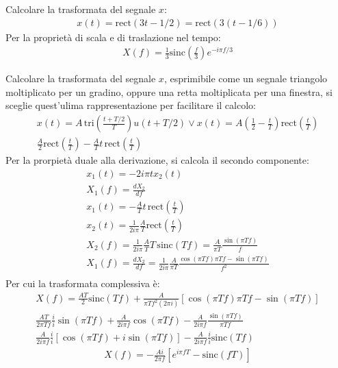 \documentclass{article}
\begin{document}
Calcolare la trasformata del segnale $x$: 
\begin{gather*}
    x(t)=\mbox{rect}(3t-1/2)=\mbox{rect}(3(t-1/6))
\end{gather*}
Per la proprietà di scala e di traslazione nel tempo:
\begin{gather}
    X(f)=\displaystyle\frac{1}{3}\mbox{sinc}\left(\frac{f}{3}\right)e^{-i\pi f/3}
\end{gather}


Calcolare la trasformata del segnale $x$, esprimibile come un segnale triangolo moltiplicato per un gradino, oppure una retta moltiplicata per una finestra, si sceglie 
quest'ulima rappresentazione per facilitare il calcolo:
\begin{gather*}
    x(t)=A\,\displaystyle\mbox{tri}\left(\frac{t+T/2}{T}\right)u(t+T/2)\lor x(t)=A\left(\frac{1}{2}-\frac{t}{T}\right)\mbox{rect}\left(\frac{t}{T}\right)\\
    \displaystyle\frac{A}{2}\mbox{rect}\left(\frac{t}{T}\right)-\frac{A}{T}t\,\mbox{rect}\left(\frac{t}{T}\right)
\end{gather*}
Per la prorpietà duale alla derivazione, si calcola il secondo componente: 
\begin{gather*}
    x_1(t)=-2i\pi tx_2(t)\\
    X_1(f)=\displaystyle\frac{dX_2}{df}\\
    x_1(t)=-\displaystyle\frac{A}{T}t\,\mbox{rect}\left(\frac{t}{T}\right)\\
    x_2(t)=\displaystyle\frac{1}{2i\pi}\frac{A}{T}\mbox{rect}\left(\frac{t}{T}\right)\\
    X_2(f)=\displaystyle\frac{1}{2i\pi}\frac{A}{T}T\,\mbox{sinc}(Tf)=\frac{A}{\pi T}\frac{\sin(\pi Tf)}{f}\\
    X_1(f)=\displaystyle\frac{dX_2}{df}=\frac{1}{2i\pi}\frac{A}{\pi T}\frac{\cos(\pi Tf)\pi Tf-\sin(\pi Tf)}{f^2}\\
\end{gather*}
Per cui la trasformata complessiva è:
\begin{gather*}
    X(f)=\displaystyle\frac{AT}{2}\mbox{sinc}(Tf)+\frac{A}{\pi Tf^2(2\pi i)}\left[\cos(\pi Tf)\pi Tf-\sin (\pi Tf)\right]\\
    \displaystyle\frac{AT}{2\pi Tf}\frac{i}{i}\sin(\pi Tf)+\frac{A}{2i\pi f}\cos(\pi Tf)-\frac{A}{2i\pi f}\frac{\sin(\pi Tf)}{\pi Tf}\\
    \displaystyle\frac{A}{2i\pi f}\frac{i}{i}\left[\cos(\pi Tf)+i\sin(\pi Tf)\right]-\frac{A}{2i\pi f}\frac{i}{i}\mbox{sinc}( Tf)
\end{gather*}
\begin{gather}
    X(f)=\displaystyle-\frac{Ai}{2\pi f}\left[e^{i\pi fT}-\mbox{sinc}(fT)\right]
\end{gather}
\end{document}
